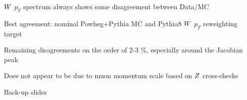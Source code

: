 \slide{}
{
\iteb
\item $W$ $p_{T}$ spectrum always shows some disagreement between Data/MC
\item Best agreement: nominal Powheg+Pythia MC and Pythia8 $W$ $p_{T}$ reweighting target
\item Remaining disagreements on the order of 2-3 \%, especially around the Jacobian peak
\item Does not appear to be due to muon momentum scale based on $Z$ cross-checks
\itee
}

\appendix
{}
\setcounter{finalframe}{\value{framenumber}}

\slide{}
{

\centering
\Huge Back-up slides
}
